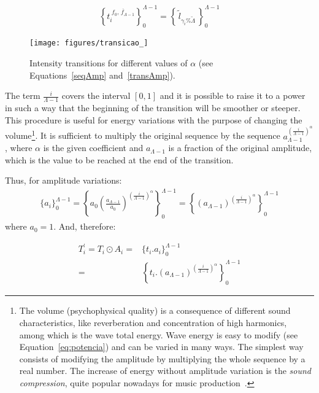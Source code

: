 \begin{equation}\label{serieAmostralLog}
 \left\{t_i^{\;\overline{f_0,\,f_{\Lambda-1}}}\right\}_0^{\Lambda-1}=\left\{\,\widetilde{l}_{\gamma_i \% \widetilde{\Lambda}}\,\right\}_0^{\Lambda-1}
\end{equation}

\begin{figure}[h!]
     \centering
         \texttt{[image: figures/transicao\_]}
     \caption{Intensity transitions for different values of $\alpha$ (see Equations~\ref{seqAmp} and~\ref{transAmp}).}
         \label{fig:transicao}
\end{figure}

The term $\frac{i}{\Lambda-1}$ covers the interval $[0,1]$ and it is possible to raise it to a power in such a way that the beginning of the transition will be smoother or steeper. This procedure is useful for energy variations with the purpose of changing the volume\footnote{The volume (psychophysical quality) is a consequence of different sound characteristics, like reverberation and concentration of high harmonics, among which is the wave total energy. Wave energy is easy to modify (see Equation~\ref{eq:potencia}) and can be varied in many ways. The simplest way consists of modifying the amplitude by multiplying the whole sequence by a real number. The increase of energy without amplitude variation is the \emph{sound compression}, quite popular nowadays for music production~\cite{guillaume}.}. It is sufficient to multiply the original sequence by the sequence $a_{\Lambda-1}^{\left( \frac{i}{\Lambda-1} \right )^\alpha}$, where $\alpha$ is the given coefficient and $a_{\Lambda-1}$ is a fraction of the original amplitude, which is the value to be reached at the end of the transition.

Thus, for amplitude variations:
\begin{equation}\label{seqAmp}
\begin{split}
 \{a_i\}_0^{\Lambda-1}= \left \{ a_0 \left ( \frac{a_{\Lambda-1}}{a_0} \right )^{\left ( \frac{i}{\Lambda-1} \right )^\alpha} \right \}_0^{\Lambda-1}= \left \{ \left ( {a_{\Lambda-1}} \right )^{\left ( \frac{i}{\Lambda-1} \right )^\alpha} \right \}_0^{\Lambda-1}
\end{split}
\end{equation}
where $a_0=1$. And, therefore:

\begin{equation}\label{transAmp}
\begin{split}
 T_i^{'}=T_i \odot A_i = & \{t_i . a_i\}_0^{\Lambda-1} \\ = & \left \{ t_i . (a_{\Lambda-1} )^{\left ( \frac{i}{\Lambda-1} \right )^\alpha} \right \}_0^{\Lambda-1}
\end{split}
\end{equation}

